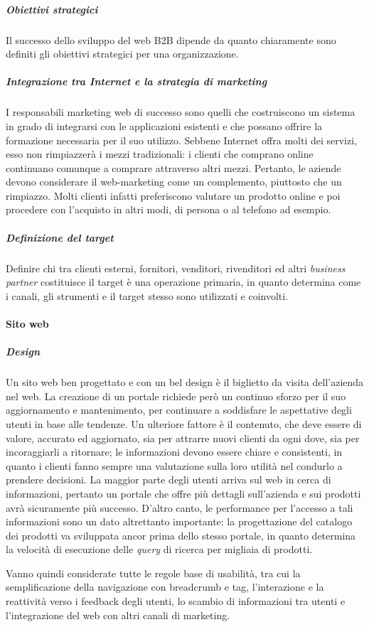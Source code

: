 \subparagraph{Obiettivi strategici}
Il successo dello sviluppo del web B2B dipende da quanto chiaramente sono definiti gli obiettivi strategici per una organizzazione.

\subparagraph{Integrazione tra Internet e la strategia di marketing}
I responsabili marketing web di successo sono quelli che costruiscono un sistema in grado di integrarsi con le applicazioni esistenti e che possano offrire la formazione necessaria per il suo utilizzo. Sebbene Internet offra molti dei servizi, esso non rimpiazzerà i mezzi tradizionali: i clienti che comprano online continuano comunque a comprare attraverso altri mezzi. Pertanto, le aziende devono considerare il web-marketing come un complemento, piuttosto che un rimpiazzo. Molti clienti infatti preferiscono valutare un prodotto online e poi procedere con l'acquisto in altri modi, di persona o al telefono ad esempio.

\subparagraph{Definizione del target}
Definire chi tra clienti esterni, fornitori, venditori, rivenditori ed altri \textit{business partner} costituisce il target è una operazione primaria, in quanto determina come i canali, gli strumenti e il target stesso sono utilizzati e coinvolti.

\paragraph{Sito web}
\subparagraph{Design}
Un sito web ben progettato e con un bel design è il biglietto da visita dell'azienda nel web. La creazione di un portale richiede però un continuo sforzo per il suo aggiornamento e mantenimento, per continuare a soddisfare le aspettative degli utenti in base alle tendenze. Un ulteriore fattore è il contenuto, che deve essere di valore, accurato ed aggiornato, sia per attrarre nuovi clienti da ogni dove, sia per incoraggiarli a ritornare; le informazioni devono essere chiare e consistenti, in quanto i clienti fanno sempre una valutazione sulla loro utilità nel condurlo a prendere decisioni. La maggior parte degli utenti arriva sul web in cerca di informazioni, pertanto un portale che offre più dettagli sull'azienda e sui prodotti avrà sicuramente più successo. D'altro canto, le performance per l'accesso a tali informazioni sono un dato altrettanto importante: la progettazione del catalogo dei prodotti va sviluppata ancor prima dello stesso portale, in quanto determina la velocità di esecuzione delle \textit{query} di ricerca per migliaia di prodotti.

Vanno quindi considerate tutte le regole base di usabilità, tra cui la semplificazione della navigazione con \gls{breadcrumb} e \gls{tag}, l'interazione e la reattività verso i \gls{feedback} degli utenti, lo scambio di informazioni tra utenti e l'integrazione del web con altri canali di marketing.\autocite{b2bSuccessFactors}

